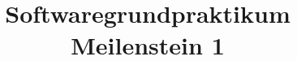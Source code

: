 \documentclass[12pt,a4paper]{scrartcl}
\begin{document}
	\title{Softwaregrundpraktikum Meilenstein 1 }
	\date{}
	
	\maketitle
	
\end{document}
